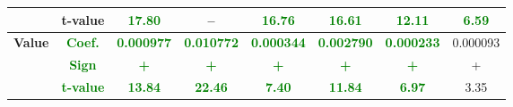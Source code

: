 \documentclass[11pt,english,a4paper,hidelinks]{book}
\begin{document}
\begin{table}[H]
\begin{tabular}{lccccccc}
            & t-value & \textbf{\textcolor{green}{17.80}} & -- & \textbf{\textcolor{green}{16.76}} & \textbf{\textcolor{green}{16.61}} & \textbf{\textcolor{green}{12.11}} & \textbf{\textcolor{green}{6.59}} \\
        \midrule
        \multirow{3}{*}{\textbf{Value}} 
            & \textbf{\textcolor{green}{Coef.}} & \textbf{\textcolor{green}{0.000977}} & \textbf{\textcolor{green}{0.010772}} & \textbf{\textcolor{green}{0.000344}} & \textbf{\textcolor{green}{0.002790}} & \textbf{\textcolor{green}{0.000233}} & 0.000093 \\
            & \textbf{\textcolor{green}{Sign}} & \textbf{\textcolor{green}{+}} & \textbf{\textcolor{green}{+}} & \textbf{\textcolor{green}{+}} & \textbf{\textcolor{green}{+}} & \textbf{\textcolor{green}{+}} & + \\
            & \textbf{\textcolor{green}{t-value}} & \textbf{\textcolor{green}{13.84}} & \textbf{\textcolor{green}{22.46}} & \textbf{\textcolor{green}{7.40}} & \textbf{\textcolor{green}{11.84}} & \textbf{\textcolor{green}{6.97}} & 3.35 \\
        \bottomrule
    \end{tabular}
    \label{tab:asia_first_model_consistency}
\end{table}
\end{document}
